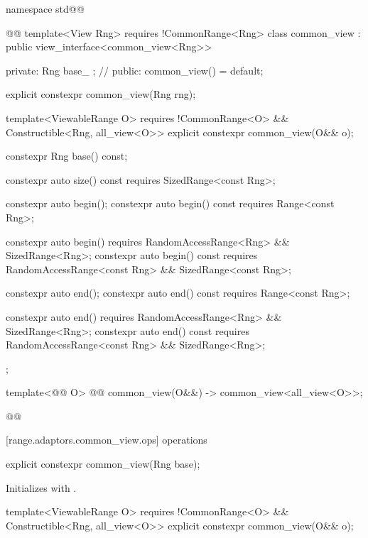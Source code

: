 {\begin{codeblock}
namespace std@@ { @@
  template<View Rng>
    requires !CommonRange<Rng>
  class common_view : public view_interface<common_view<Rng>> {
  private:
    Rng base_ {}; // \expos
  public:
    common_view() = default;

    explicit constexpr common_view(Rng rng);

    template<ViewableRange O>
      requires !CommonRange<O> && Constructible<Rng, all_view<O>>
    explicit constexpr common_view(O&& o);

    constexpr Rng base() const;

    constexpr auto size() const requires SizedRange<const Rng>;

    constexpr auto begin();
    constexpr auto begin() const requires Range<const Rng>;

    constexpr auto begin()
      requires RandomAccessRange<Rng> && SizedRange<Rng>;
    constexpr auto begin() const
      requires RandomAccessRange<const Rng> && SizedRange<const Rng>;

    constexpr auto end();
    constexpr auto end() const requires Range<const Rng>;

    constexpr auto end()
      requires RandomAccessRange<Rng> && SizedRange<Rng>;
    constexpr auto end() const
      requires RandomAccessRange<const Rng> && SizedRange<Rng>;
  };

  template<@@ O>
    @@
  common_view(O&&) -> common_view<all_view<O>>;
}@\oldtxt{\}}@
\end{codeblock}

[range.adaptors.common_view.ops]{ operations}

%
\begin{itemdecl}
explicit constexpr common_view(Rng base);
\end{itemdecl}

\begin{itemdescr}
\pnum
\effects Initializes  with .
\end{itemdescr}

%
\begin{itemdecl}
template<ViewableRange O>
  requires !CommonRange<O> && Constructible<Rng, all_view<O>>
explicit constexpr common_view(O&& o);
\end{itemdecl}

}
